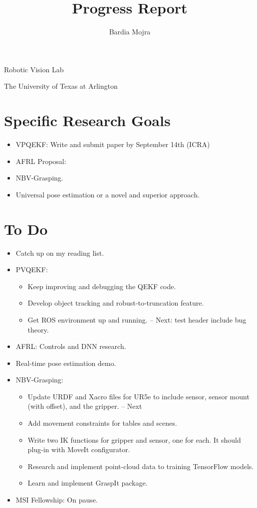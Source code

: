 \documentclass[11pt]{article}
\title{Progress Report}
\author{Bardia Mojra}
\begin{document}
\maketitle
\thispagestyle{empty}

\bigskip
\bigskip
\begin{center}
      Robotic Vision Lab
\end{center}

\begin{center}
      The University of Texas at Arlington
\end{center}

\newpage

\section{Specific Research Goals}
\begin{itemize}
      \item VPQEKF: Write and submit paper by September 14th (ICRA)
      \item AFRL Proposal:
      \item NBV-Grasping.
      \item Universal pose estimation or a novel and superior approach.
\end{itemize}

\section{To Do}
\begin{itemize}
  \item Catch up on my reading list.
  \item PVQEKF:
  \begin{itemize}
      \item Keep improving and debugging the QEKF code.
      \item Develop object tracking and robust-to-truncation feature.
      \item Get ROS environment up and running. -- Next: test header include bug theory.
  \end{itemize}
  \item AFRL: Controls and DNN research.
  \item Real-time pose estimation demo.
  \item NBV-Grasping:
      \begin{itemize}
      \item Update URDF and Xacro files for UR5e to include sensor, sensor mount (with offset), and the gripper. -- Next
      \item Add movement constraints for tables and scenes.
      \item Write two IK functions for gripper and sensor, one for each. It should plug-in with MoveIt configurator.
      \item Research and implement point-cloud data to training TensorFlow models.
      \item Learn and implement GraspIt package.
      \end{itemize}
  \item MSI Fellowship: On pause.
\end{itemize}
\end{document}
